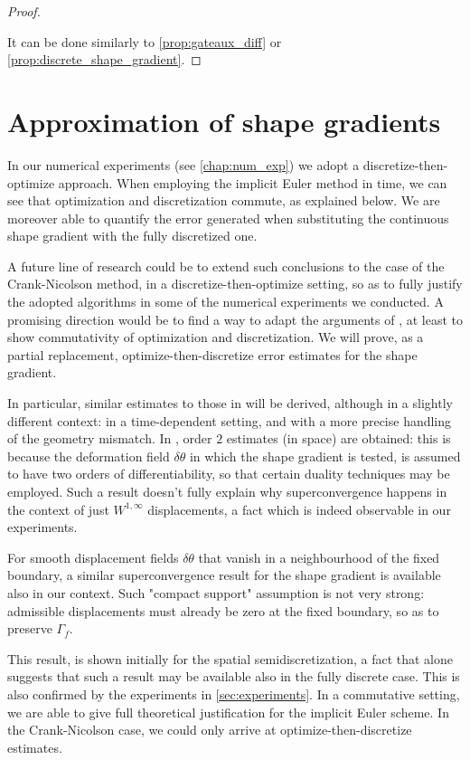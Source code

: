 \documentclass[english,a4paper,9pt,oneside]{scrbook}	%
\theoremstyle{break}
\newenvironment{mproof}[1][\proofname]{%
  \begin{proof}[#1]$ $\par\nobreak\ignorespaces
}{%
  \end{proof}
}
\renewcommand*{\proofname}{Proof}
\theoremstyle{remark}
\newcommand{\te}{\theta}
\begin{document}
\begin{mproof}
It can be done similarly to \cref{prop:gateaux_diff} or \cref{prop:discrete_shape_gradient}.
\end{mproof}

\section{Approximation of shape gradients}
\label{sec:d-t-o_IE}

In our numerical experiments (see \cref{chap:num_exp}) we adopt a discretize-then-optimize approach. When employing the implicit Euler method in time, we can see that optimization and discretization commute, as explained below. We are moreover able to quantify the error generated when substituting the continuous shape gradient with the fully discretized one. 

A future line of research could be to extend such conclusions to the case of the Crank-Nicolson method, in a discretize-then-optimize setting, so as to fully justify the adopted algorithms in some of the numerical experiments we conducted. A promising direction would be to find a way to adapt the arguments of \cite{flaig}, at least to show commutativity of optimization and discretization. We will prove, as a partial replacement, optimize-then-discretize error estimates for the shape gradient.

In particular, similar estimates to those in \cite{paganini} will be derived, although in a slightly different context: in a time-dependent setting, and with a more precise handling of the geometry mismatch. In \cite{paganini}, order $2$ estimates (in space) are obtained: this is because the deformation field $\delta \te$  in which the shape gradient is tested, is assumed to have two orders of differentiability, so that certain duality techniques may be employed. Such a result doesn't fully explain why superconvergence happens in the context of just $W^{1,\infty}$ displacements, a fact which is indeed observable in our experiments.

For smooth displacement fields $\delta \te$ that vanish in a neighbourhood of the fixed boundary, a similar superconvergence result for the shape gradient is available also in our context. Such "compact support" assumption is not very strong: admissible displacements must already be zero at the fixed boundary, so as to preserve $\Gamma_f$.

This result, is shown initially for the spatial semidiscretization, a fact that alone suggests that such a result may be available also in the fully discrete case. This is also confirmed by the experiments in \cref{sec:experiments}. In a commutative setting, we are able to give full theoretical justification for the implicit Euler scheme. In the Crank-Nicolson case, we could only arrive at optimize-then-discretize estimates.
\end{document}

